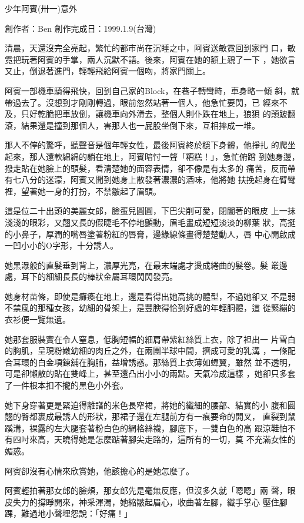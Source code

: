 



少年阿賓(卅一)意外

創作者：Ben
創作完成日：1999.1.9(台灣)


清晨，天還沒完全亮起，繁忙的都市尚在沉睡之中，阿賓送敏霓回到家門
口，敏霓把玩著阿賓的手掌，兩人沉默不語。後來，阿賓在她的額上親了一下
，她欲言又止，倒退著進門，輕輕飛給阿賓一個吻，將家門關上。

阿賓一部機車騎得飛快，回到自己家的Block，在巷子轉彎時，車身略一傾
斜，就帶過去了。沒想到才剛剛轉過，眼前忽然站著一個人，他急忙要閃，已
經來不及，只好乾脆把車放倒，讓機車向外滑去，整個人則仆跌在地上，狼狽
的顛跛翻滾，結果還是撞到那個人，害那人也一屁股坐倒下來，互相摔成一堆。

那人不停的驚呼，聽聲音是個年輕女性，最後阿賓終於穩下身體，他掙扎
的爬坐起來，那人還軟綿綿的躺在地上，阿賓暗忖一聲「糟糕！」，急忙俯蹭
到她身邊，撥走貼在她臉上的頭髮，看清楚她的面容表情，卻不像是有太多的
痛苦，反而帶有七八分的迷濛，阿賓又聞到她身上散發著濃濃的酒味，他將她
扶挽起身在臂彎裡，望著她一身的打扮，不禁皺起了眉頭。

這是位二十出頭的美麗女郎，臉蛋兒圓圓，下巴尖削可愛，閉闔著的眼皮
上一抹淺淺的眼彩，又翹又長的假睫毛不停地顫動，眉毛畫成短短淡淡的柳葉
狀，高挺的小鼻子，厚潤的嘴唇塗著粉紅的唇膏，邊緣線條畫得楚楚動人，唇
中心開啟成一凹小小的O字形，十分誘人。

她黑瀑般的直髮垂到背上，濃厚光亮，在最末端處才燙成綣曲的髮卷。髮
叢邊處，耳下的細細長長的棒狀金屬耳環閃閃發亮。

她身材苗條，即使是癱瘓在地上，還是看得出她高挑的體型，不過她卻又
不是弱不禁風的那種女孩，幼細的骨架上，是豐腴得恰到好處的年輕胴體，這
從緊繃的衣衫便一覽無遺。

她那套服裝實在令人窒息，低胸短幅的細肩帶紫紅絲質上衣，除了袒出一
片雪白的胸肌，呈現粉嫩幼細的肉丘之外，在兩團半球中間，擠成可愛的乳溝
，一條配合耳環的白金項鍊舖在胸脯，益增誘惑。那絲質上衣薄如蟬翼，雖然
並不透明，可是卻懶散的貼在雙峰上，甚至還凸出小小的兩點。天氣冷成這樣
，她卻只多套了一件根本扣不攏的黑色小外套。

她下身穿著更是緊迫得離譜的米色長窄裙，將她的纖細的腰部、結實的小
腹和圓翹的臀都裹成最誘人的形狀，那裙子還在左腿前方有一痕要命的開叉，
直裂到鼠蹊溝，裸露的左大腿套著粉白色的網格絲襪，腳底下，一雙白色的高
跟涼鞋怕不有四吋來高，天曉得她是怎麼踮著腳尖走路的，這所有的一切，莫
不充滿女性的媚惑。

阿賓卻沒有心情來欣賞她，他該擔心的是她怎麼了。

阿賓輕拍著那女郎的臉頰，那女郎先是毫無反應，但沒多久就「嗯嗯」兩
聲，眼皮失力的撐睜開來，神采渾濁，她縮皺起眉心，收曲著左腳，纖手掌心
壓住腳踝，難過地小聲埋怨說：「好痛！」

